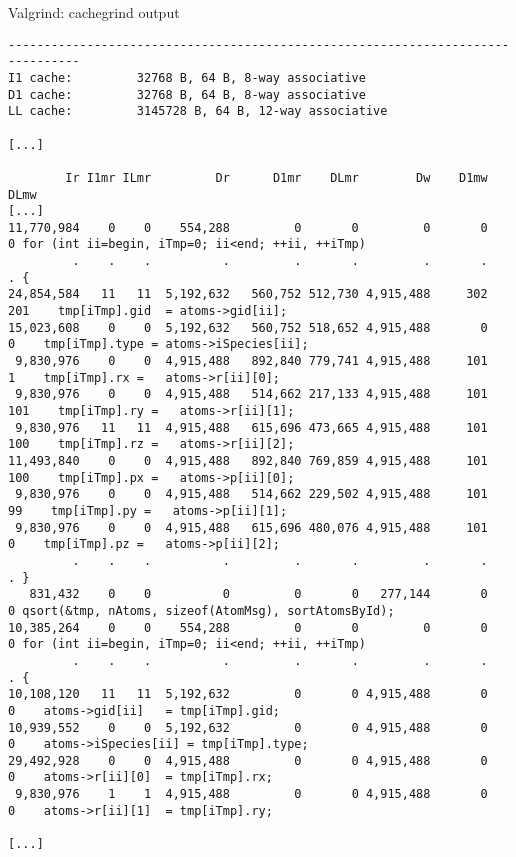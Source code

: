 \documentclass[10pt,xcolor=table]{beamer}
\begin{document}
\begin{frame}[fragile]{Valgrind: cachegrind output}

  \vspace*{-0.5cm}

  \begin{lstlisting}[style=valgrind,xleftmargin=-0.75cm,basicstyle=\tiny\ttfamily,caption={Cachegrind
      output: annotated output}]
% cg_annotate --auto=yes cachegrind.out.30363
--------------------------------------------------------------------------------
I1 cache:         32768 B, 64 B, 8-way associative
D1 cache:         32768 B, 64 B, 8-way associative
LL cache:         3145728 B, 64 B, 12-way associative

[...]

        Ir I1mr ILmr         Dr      D1mr    DLmr        Dw    D1mw   DLmw
[...]
11,770,984    0    0    554,288         0       0         0       0      0 for (int ii=begin, iTmp=0; ii<end; ++ii, ++iTmp)
         .    .    .          .         .       .         .       .      . {
24,854,584   11   11  5,192,632   560,752 512,730 4,915,488     302    201    tmp[iTmp].gid  = atoms->gid[ii];
15,023,608    0    0  5,192,632   560,752 518,652 4,915,488       0      0    tmp[iTmp].type = atoms->iSpecies[ii];
 9,830,976    0    0  4,915,488   892,840 779,741 4,915,488     101      1    tmp[iTmp].rx =   atoms->r[ii][0];
 9,830,976    0    0  4,915,488   514,662 217,133 4,915,488     101    101    tmp[iTmp].ry =   atoms->r[ii][1];
 9,830,976   11   11  4,915,488   615,696 473,665 4,915,488     101    100    tmp[iTmp].rz =   atoms->r[ii][2];
11,493,840    0    0  4,915,488   892,840 769,859 4,915,488     101    100    tmp[iTmp].px =   atoms->p[ii][0];
 9,830,976    0    0  4,915,488   514,662 229,502 4,915,488     101     99    tmp[iTmp].py =   atoms->p[ii][1];
 9,830,976    0    0  4,915,488   615,696 480,076 4,915,488     101      0    tmp[iTmp].pz =   atoms->p[ii][2];
         .    .    .          .         .       .         .       .      . }
   831,432    0    0          0         0       0   277,144       0      0 qsort(&tmp, nAtoms, sizeof(AtomMsg), sortAtomsById);
10,385,264    0    0    554,288         0       0         0       0      0 for (int ii=begin, iTmp=0; ii<end; ++ii, ++iTmp)
         .    .    .          .         .       .         .       .      . {
10,108,120   11   11  5,192,632         0       0 4,915,488       0      0    atoms->gid[ii]   = tmp[iTmp].gid;
10,939,552    0    0  5,192,632         0       0 4,915,488       0      0    atoms->iSpecies[ii] = tmp[iTmp].type;
29,492,928    0    0  4,915,488         0       0 4,915,488       0      0    atoms->r[ii][0]  = tmp[iTmp].rx;
 9,830,976    1    1  4,915,488         0       0 4,915,488       0      0    atoms->r[ii][1]  = tmp[iTmp].ry;

[...]
\end{lstlisting}

\end{frame}
\end{document}
